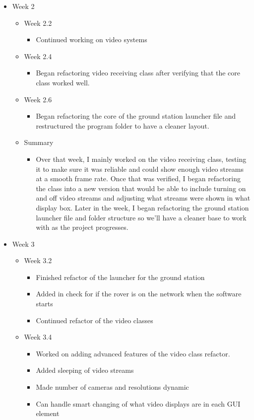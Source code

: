 \begin{itemize}
\item Week 2
	\begin{itemize}
	\item Week 2.2
      \begin{itemize}
      \item Continued working on video systems 
      \end{itemize}
	\item Week 2.4
      \begin{itemize}
      \item Began refactoring video receiving class after verifying that the core class worked well. 
      \end{itemize}
	\item Week 2.6
      \begin{itemize}
      \item Began refactoring the core of the ground station launcher file and restructured the program folder to have a cleaner layout. 
      \end{itemize}
    
    \item Summary
      \begin{itemize}
      \item Over that week, I mainly worked on the video receiving class, testing it to make sure it was reliable and could show enough video streams at a smooth frame rate. Once that was verified, I began refactoring the class into a new version that would be able to include turning on and off video streams and adjusting what streams were shown in what display box. Later in the week, I began refactoring the ground station launcher file and folder structure so we'll have a cleaner base to work with as the project progresses. 
      \end{itemize}
	\end{itemize}

\item Week 3
	\begin{itemize}
	\item Week 3.2
      \begin{itemize}
      \item Finished refactor of the launcher for the ground station 
      \item Added in check for if the rover is on the network when the software starts 
      \item Continued refactor of the video classes 
      \end{itemize}
	\item Week 3.4
      \begin{itemize}
      \item Worked on adding advanced features of the video class refactor. 
      \item Added sleeping of video streams 
      \item Made number of cameras and resolutions dynamic 
      \item Can handle smart changing of what video displays are in each GUI element 
      \end{itemize}
    

\end{itemize}
\end{itemize}
